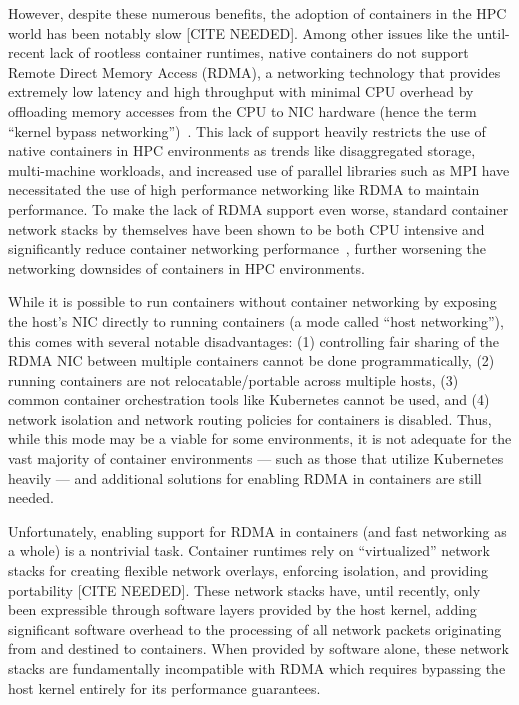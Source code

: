 \documentclass[12pt,titlepage]{article}
\begin{document}
However, despite these numerous benefits, the adoption of containers in the HPC world has been notably slow [CITE NEEDED].
Among other issues like the until-recent lack of rootless container runtimes, native containers do not support Remote Direct Memory Access (RDMA), a networking technology that provides extremely low latency and high throughput with minimal CPU overhead by offloading memory accesses from the CPU to NIC hardware (hence the term ``kernel bypass networking'')~\cite{mellanoxrocerdmabenefits}.
This lack of support heavily restricts the use of native containers in HPC environments as trends like disaggregated storage, multi-machine workloads, and increased use of parallel libraries such as MPI have necessitated the use of high performance networking like RDMA to maintain performance.
To make the lack of RDMA support even worse, standard container network stacks by themselves have been shown to be both CPU intensive and significantly reduce container networking performance~\cite{abbasi2019performance}, further worsening the networking downsides of containers in HPC environments.

While it is possible to run containers without container networking by exposing the host's NIC directly to running containers (a mode called ``host networking''), this comes with several notable disadvantages:
(1) controlling fair sharing of the RDMA NIC between multiple containers cannot be done programmatically,
(2) running containers are not relocatable/portable across multiple hosts,
(3) common container orchestration tools like Kubernetes cannot be used,
and (4) network isolation and network routing policies for containers is disabled.
Thus, while this mode may be a viable for some environments, it is not adequate for the vast majority of container environments --- such as those that utilize Kubernetes heavily --- and additional solutions for enabling RDMA in containers are still needed.

Unfortunately, enabling support for RDMA in containers (and fast networking as a whole) is a nontrivial task.
Container runtimes rely on ``virtualized'' network stacks for creating flexible network overlays, enforcing isolation, and providing portability [CITE NEEDED].
These network stacks have, until recently, only been expressible through software layers provided by the host kernel, adding significant software overhead to the processing of all network packets originating from and destined to containers.
When provided by software alone, these network stacks are fundamentally incompatible with RDMA which requires bypassing the host kernel entirely for its performance guarantees.
\end{document}
